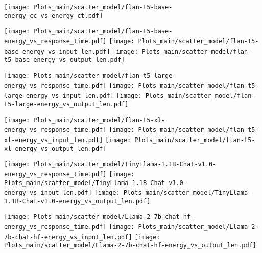 \begin{figure*}[!ht]
    \centering
    
    \texttt{[image: Plots\_main/scatter\_model/flan-t5-base-energy\_cc\_vs\_energy\_ct.pdf]}
    \vspace*{-4mm}
    
    {\texttt{[image: Plots\_main/scatter\_model/flan-t5-base-energy\_vs\_response\_time.pdf]}}
    {\texttt{[image: Plots\_main/scatter\_model/flan-t5-base-energy\_vs\_input\_len.pdf]}}
    {\texttt{[image: Plots\_main/scatter\_model/flan-t5-base-energy\_vs\_output\_len.pdf]}}

    {\texttt{[image: Plots\_main/scatter\_model/flan-t5-large-energy\_vs\_response\_time.pdf]}}
    {\texttt{[image: Plots\_main/scatter\_model/flan-t5-large-energy\_vs\_input\_len.pdf]}}
    {\texttt{[image: Plots\_main/scatter\_model/flan-t5-large-energy\_vs\_output\_len.pdf]}}

    {\texttt{[image: Plots\_main/scatter\_model/flan-t5-xl-energy\_vs\_response\_time.pdf]}}
    {\texttt{[image: Plots\_main/scatter\_model/flan-t5-xl-energy\_vs\_input\_len.pdf]}}
    {\texttt{[image: Plots\_main/scatter\_model/flan-t5-xl-energy\_vs\_output\_len.pdf]}}


    {\texttt{[image: Plots\_main/scatter\_model/TinyLlama-1.1B-Chat-v1.0-energy\_vs\_response\_time.pdf]}}
    {\texttt{[image: Plots\_main/scatter\_model/TinyLlama-1.1B-Chat-v1.0-energy\_vs\_input\_len.pdf]}}
    {\texttt{[image: Plots\_main/scatter\_model/TinyLlama-1.1B-Chat-v1.0-energy\_vs\_output\_len.pdf]}}




    {\texttt{[image: Plots\_main/scatter\_model/Llama-2-7b-chat-hf-energy\_vs\_response\_time.pdf]}}
    {\texttt{[image: Plots\_main/scatter\_model/Llama-2-7b-chat-hf-energy\_vs\_input\_len.pdf]}}
    {\texttt{[image: Plots\_main/scatter\_model/Llama-2-7b-chat-hf-energy\_vs\_output\_len.pdf]}}



\end{figure*}
